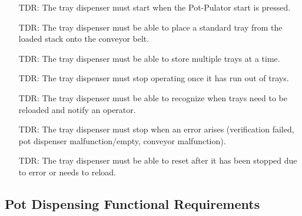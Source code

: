 \documentclass[12pt]{article}
\newcounter{tdreqnum} %
\newcounter{reqnum} %
\begin{document}
  \noindent \begin{itemize}
  
  \item[TDR\refstepcounter{tdreqnum}\thetdreqnum \label{R_Tray0}:] {The tray dispenser must
      start when the Pot-Pulator start is pressed.}
  
  \item[TDR\refstepcounter{tdreqnum}\thetdreqnum \label{R_Tray1}:] {The tray dispenser must
      be able to place a standard tray from the loaded stack onto the conveyor belt.}
  
  \item[TDR\refstepcounter{tdreqnum}\thetdreqnum \label{R_Tray2}:] {The tray dispenser must
        be able to store multiple trays at a time.}
  
  \item[TDR\refstepcounter{tdreqnum}\thetdreqnum \label{R_Tray5}:] {The tray dispenser must
      stop operating once it has run out of trays.}
  
  \item[TDR\refstepcounter{tdreqnum}\thetdreqnum \label{R_Tray6}:] {The tray dispenser must
      be able to recognize when trays need to be reloaded and notify an operator.}
  
  \item[TDR\refstepcounter{tdreqnum}\thetdreqnum \label{R_Tray7}:] {The tray dispenser must
       stop when an error arises (verification failed, pot dispenser malfunction/empty, conveyor
       malfunction).}
  
  \item[TDR\refstepcounter{tdreqnum}\thetdreqnum \label{R_Tray8}:] {The tray dispenser must
      be able to reset after it has been stopped due to error or needs to reload.}
  
  
  \end{itemize}
  
  \subsection{Pot Dispensing Functional Requirements}
  
\end{document}
